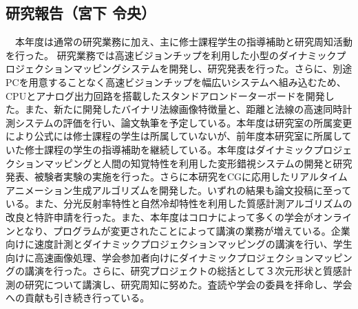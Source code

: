 \subsection{研究報告（宮下 令央）}

　本年度は通常の研究業務に加え、主に修士課程学生の指導補助と研究周知活動を行った。
研究業務では高速ビジョンチップを利用した小型のダイナミックプロジェクションマッピングシステムを開発し、研究発表を行った。さらに、別途PCを用意することなく高速ビジョンチップを幅広いシステムへ組み込むため、CPUとアナログ出力回路を搭載したスタンドアロンドーターボードを開発した。また、新たに開発したバイナリ法線画像特徴量と、距離と法線の高速同時計測システムの評価を行い、論文執筆を予定している。本年度は研究室の所属変更により公式には修士課程の学生は所属していないが、前年度本研究室に所属していた修士課程の学生の指導補助を継続している。本年度はダイナミックプロジェクションマッピングと人間の知覚特性を利用した変形錯視システムの開発と研究発表、被験者実験の実施を行った。さらに本研究をCGに応用したリアルタイムアニメーション生成アルゴリズムを開発した。いずれの結果も論文投稿に至っている。また、分光反射率特性と自然冷却特性を利用した質感計測アルゴリズムの改良と特許申請を行った。また、本年度はコロナによって多くの学会がオンラインとなり、プログラムが変更されたことによって講演の業務が増えている。企業向けに速度計測とダイナミックプロジェクションマッピングの講演を行い、学生向けに高速画像処理、学会参加者向けにダイナミックプロジェクションマッピングの講演を行った。さらに、研究プロジェクトの総括として３次元形状と質感計測の研究について講演し、研究周知に努めた。査読や学会の委員を拝命し、学会への貢献も引き続き行っている。


